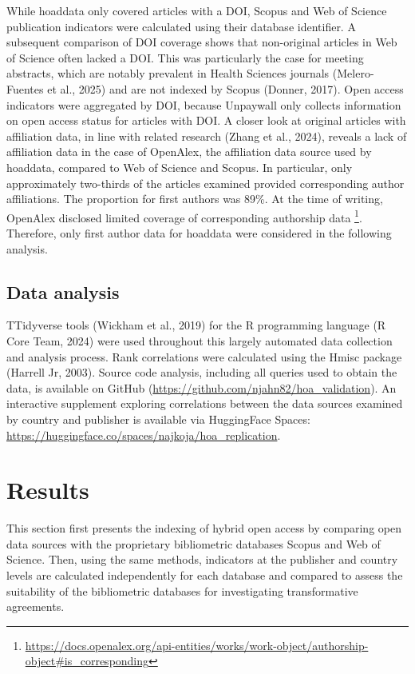 \documentclass[a4paper,man,floatsintext,longtable,noextraspace,10pt]{apa6}
\begin{document}
While hoaddata only covered articles with a DOI, Scopus and Web of
Science publication indicators were calculated using their database
identifier. A subsequent comparison of DOI coverage shows that
non-original articles in Web of Science often lacked a DOI. This was
particularly the case for meeting abstracts, which are notably prevalent
in Health Sciences journals (Melero-Fuentes et al., 2025) and are not
indexed by Scopus (Donner, 2017). Open access indicators were aggregated
by DOI, because Unpaywall only collects information on open access
status for articles with DOI. A closer look at original articles with
affiliation data, in line with related research (Zhang et al., 2024),
reveals a lack of affiliation data in the case of OpenAlex, the
affiliation data source used by hoaddata, compared to Web of Science and
Scopus. In particular, only approximately two-thirds of the articles
examined provided corresponding author affiliations. The proportion for
first authors was 89\%. At the time of writing, OpenAlex disclosed
limited coverage of corresponding authorship data \footnote{\url{https://docs.openalex.org/api-entities/works/work-object/authorship-object\#is_corresponding}}.
Therefore, only first author data for hoaddata were considered in the
following analysis.

\subsection{Data analysis}\label{data-analysis}

TTidyverse tools (Wickham et al., 2019) for the R programming language
(R Core Team, 2024) were used throughout this largely automated data
collection and analysis process. Rank correlations were calculated using
the Hmisc package (Harrell Jr, 2003). Source code analysis, including
all queries used to obtain the data, is available on GitHub
(\url{https://github.com/njahn82/hoa_validation}). An interactive
supplement exploring correlations between the data sources examined by
country and publisher is available via HuggingFace Spaces:
\url{https://huggingface.co/spaces/najkoja/hoa_replication}.

\section{Results}\label{results}

This section first presents the indexing of hybrid open access by
comparing open data sources with the proprietary bibliometric databases
Scopus and Web of Science. Then, using the same methods, indicators at
the publisher and country levels are calculated independently for each
database and compared to assess the suitability of the bibliometric
databases for investigating transformative agreements.
\end{document}
